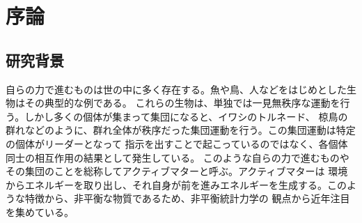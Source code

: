 \documentclass[/Users/ikedahajime/GitHub/reserch/master_report/thesis]{subfiles}
\begin{document}
\chapter{序論}

\section{研究背景}
自らの力で進むものは世の中に多く存在する。魚や鳥、人などをはじめとした生物はその典型的な例である。
これらの生物は、単独では一見無秩序な運動を行う。しかし多くの個体が集まって集団になると、イワシのトルネード、
椋鳥の群れなどのように、群れ全体が秩序だった集団運動を行う。この集団運動は特定の個体がリーダーとなって
指示を出すことで起こっているのではなく、各個体同士の相互作用の結果として発生している。
このような自らの力で進むものやその集団のことを総称してアクティブマターと呼ぶ。アクティブマターは
環境からエネルギーを取り出し、それ自身が前を進みエネルギーを生成する。このような特徴から、非平衡な物質であるため、非平衡統計力学の
観点から近年注目を集めている。\\%
\end{document}
